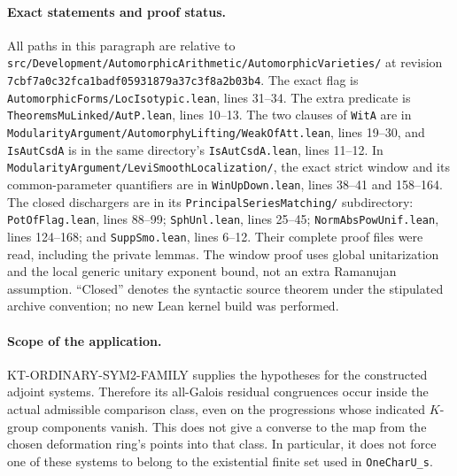 \paragraph{Exact statements and proof status.}
All paths in this paragraph are relative to
\texttt{src/Development/AutomorphicArithmetic/AutomorphicVarieties/}
at revision \texttt{7cbf7a0c32fca1badf05931879a37c3f8a2b03b4}.
The exact flag is \texttt{AutomorphicForms/LocIsotypic.lean},
lines 31--34. The extra predicate is
\texttt{TheoremsMuLinked/AutP.lean}, lines 10--13.
The two clauses of \texttt{WitA} are in
\texttt{ModularityArgument/AutomorphyLifting/WeakOfAtt.lean},
lines 19--30, and \texttt{IsAutCsdA} is in the same directory's
\texttt{IsAutCsdA.lean}, lines 11--12.
In \texttt{ModularityArgument/LeviSmoothLocalization/}, the exact
strict window and its common-parameter quantifiers are in
\texttt{WinUpDown.lean}, lines 38--41 and 158--164.
The closed dischargers are in its
\texttt{PrincipalSeriesMatching/} subdirectory:
\texttt{PotOfFlag.lean}, lines 88--99;
\texttt{SphUnl.lean}, lines 25--45;
\texttt{NormAbsPowUnif.lean}, lines 124--168; and
\texttt{SuppSmo.lean}, lines 6--12.
Their complete proof files were read, including the private lemmas.
The window proof uses global unitarization and the local generic
unitary exponent bound, not an extra Ramanujan assumption.
``Closed'' denotes the syntactic source theorem under the stipulated
archive convention; no new Lean kernel build was performed.

\paragraph{Scope of the application.}
KT-ORDINARY-SYM2-FAMILY supplies the hypotheses for the constructed
adjoint systems. Therefore its all-Galois residual congruences occur
inside the actual admissible comparison class, even on the
progressions whose indicated $K$-group components vanish.
This does not give a converse to the map from the chosen deformation
ring's points into that class. In particular, it does not force one
of these systems to belong to the existential finite set used in
\texttt{OneCharU\_s}.

